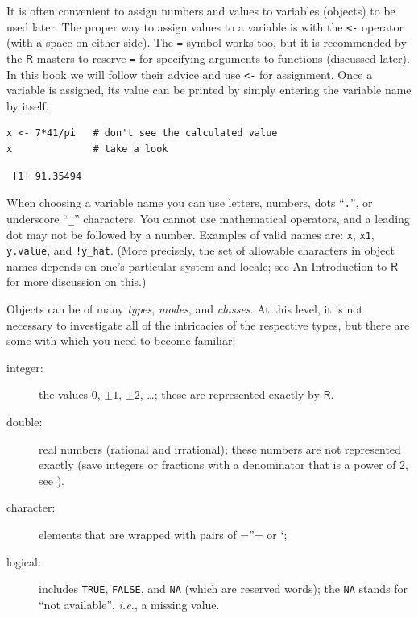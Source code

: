 \documentclass[captions=tableheading]{scrbook}
\begin{document}
It is often convenient to assign numbers and values to variables (objects) to be used later. The proper way to assign values to a variable is with the \texttt{<-} operator (with a space on either side). The \verb~=~ symbol works too, but it is recommended by the \(\mathsf{R}\) masters to reserve \verb~=~ for specifying arguments to functions (discussed later). In this book we will follow their advice and use \texttt{<-} for assignment. Once a variable is assigned, its value can be printed by simply entering the variable name by itself.


\begin{verbatim}
x <- 7*41/pi   # don't see the calculated value
x              # take a look
\end{verbatim}

\begin{verbatim}
 [1] 91.35494
\end{verbatim}

When choosing a variable name you can use letters, numbers, dots ``\texttt{.}'', or underscore ``\texttt{\_}'' characters. You cannot use mathematical operators, and a leading dot may not be followed by a number. Examples of valid names are: \texttt{x}, \texttt{x1}, \texttt{y.value}, and \texttt{!y\_hat}. (More precisely, the set of allowable characters in object names depends on one's particular system and locale; see An Introduction to \(\mathsf{R}\) for more discussion on this.)

Objects can be of many \emph{types}, \emph{modes}, and \emph{classes}. At this level, it is not necessary to investigate all of the intricacies of the respective types, but there are some with which you need to become familiar:

\begin{description}
\item[integer:] the values \(0\), \(\pm1\), \(\pm2\), \ldots{}; these are represented exactly by \(\mathsf{R}\).
\item[double:] real numbers (rational and irrational); these numbers are not represented exactly (save integers or fractions with a denominator that is a power of 2, see \cite{Venables2010}).
\item[character:] elements that are wrapped with pairs of =''= or `;
\item[logical:] includes \texttt{TRUE}, \texttt{FALSE}, and \texttt{NA} (which are reserved words); the \texttt{NA} stands for ``not available'', \emph{i.e.}, a missing value.
\end{description}
\end{document}
